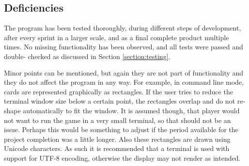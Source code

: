 \newpage
\subsection{Deficiencies}

The program has been tested thoroughly, during different steps of development, after every sprint in a larger scale, and as a final complete product multiple times. No missing functionality has been observed, and all tests were passed and double- checked as discussed in Section \ref{section:testing}.

Minor points can be mentioned, but again they are not part of functionality and they do not affect the program in any way. For example, in command line mode, cards are represented graphically as rectangles. If the user tries to reduce the terminal window size below a certain point, the rectangles overlap and do not re-shape automatically to fit the window. It is assumed though, that player would not want to run the game in a very small terminal, so that should not be an issue. Perhaps this would be something to adjust if the period available for the project completion was a little longer. Also these rectangles are drawn using Unicode characters. As such it is recommended that a terminal is used with support for UTF-8 encoding, otherwise the display may not render as intended.
